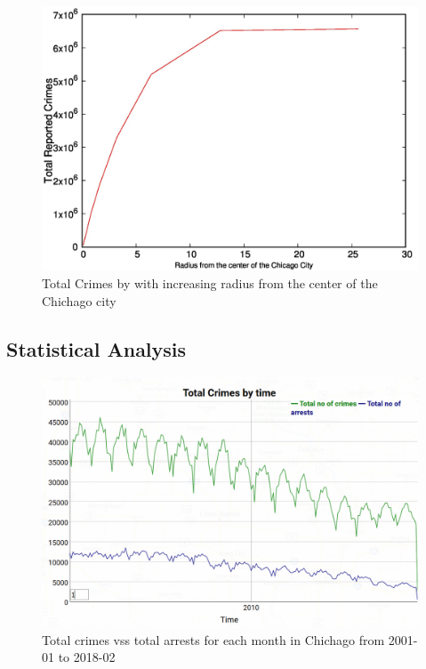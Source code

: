 \begin{figure}[htb]
	\centering\includegraphics[width=\columnwidth]{../images/geo4.jpg}
	\caption{Total Crimes by with increasing radius from the center of the Chichago city}\label{fig:crimes-with-radius}
\end{figure}

\subsection{Statistical Analysis}

\begin{figure}[htb]
	\centering\includegraphics[width=\columnwidth]{../images/stat1.jpg}
	\caption{Total crimes vss total arrests for each month in Chichago from 2001-01 to 2018-02}\label{fig:time-top10crimes-local}
\end{figure}

